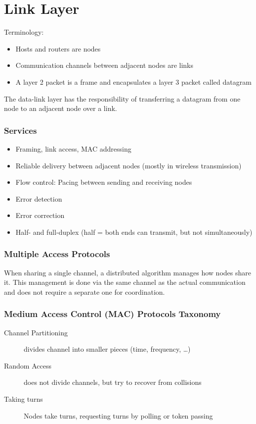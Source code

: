 
\section{Link Layer}
Terminology:
\begin{itemize}
  \item Hosts and routers are nodes
  \item Communication channels between adjacent nodes are links
  \item A layer 2 packet is a frame and encapsulates a layer 3 packet called datagram
\end{itemize}

The data-link layer has the responsibility of transferring a datagram from one node to an adjacent node over a link.

\subsubsection*{Services}
\begin{itemize}
  \item Framing, link access, MAC addressing
  \item Reliable delivery between adjacent nodes (mostly in wireless transmission)
  \item Flow control: Pacing between sending and receiving nodes
  \item Error detection
  \item Error correction
  \item Half- and full-duplex (half = both ends can transmit, but not simultaneously)
\end{itemize}

\subsubsection*{Multiple Access Protocols}
When sharing a single channel, a distributed algorithm manages how nodes share it.
This management is done via the same channel as the actual communication and does not require a separate one for coordination.

\subsubsection*{Medium Access Control (MAC) Protocols Taxonomy}
\begin{description}
  \item[Channel Partitioning] divides channel into smaller pieces (time, frequency, \dots)
  \item[Random Access] does not divide channels, but try to recover from collisions
  \item[Taking turns] Nodes take turns, requesting turns by polling or token passing
\end{description}

